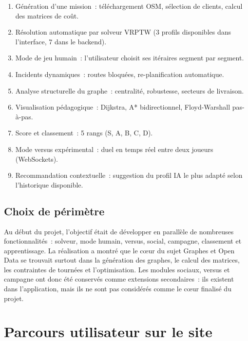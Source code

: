 \documentclass[a4paper, 12pt, twoside]{article}
\begin{document}
\begin{enumerate}
  \item G\'{e}n\'{e}ration d'une mission~: t\'{e}l\'{e}chargement OSM, s\'{e}lection de clients,
        calcul des matrices de co\^{u}t.
  \item R\'{e}solution automatique par solveur VRPTW (3 profils disponibles dans l'interface,
        7 dans le backend).
  \item Mode de jeu humain~: l'utilisateur choisit ses it\'{e}raires segment par segment.
  \item Incidents dynamiques~: routes bloqu\'{e}es, re-planification automatique.
  \item Analyse structurelle du graphe~: centralit\'{e}, robustesse, secteurs de livraison.
  \item Visualisation p\'{e}dagogique~: Dijkstra, A* bidirectionnel, Floyd-Warshall pas-\`{a}-pas.
  \item Score et classement~: 5 rangs (S, A, B, C, D).
  \item Mode versus exp\'{e}rimental~: duel en temps r\'{e}el entre deux joueurs (WebSockets).
  \item Recommandation contextuelle~: suggestion du profil IA le plus adapt\'{e} selon
        l'historique disponible.
\end{enumerate}

\subsection{Choix de p\'{e}rim\`{e}tre}

Au d\'{e}but du projet, l'objectif \'{e}tait de d\'{e}velopper en parall\`{e}le de nombreuses
fonctionnalit\'{e}s~: solveur, mode humain, versus, social, campagne, classement et apprentissage.
La r\'{e}alisation a montr\'{e} que le c\oe ur du sujet Graphes et Open Data se trouvait surtout
dans la g\'{e}n\'{e}ration des graphes, le calcul des matrices, les contraintes de tourn\'{e}es
et l'optimisation. Les modules sociaux, versus et campagne ont donc \'{e}t\'{e} conserv\'{e}s
comme extensions secondaires~: ils existent dans l'application, mais ils ne sont pas consid\'{e}r\'{e}s
comme le c\oe ur finalis\'{e} du projet.

\section{Parcours utilisateur sur le site}
\end{document}
